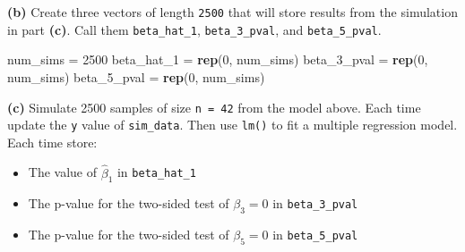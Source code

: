 \documentclass[
]{article}
\newenvironment{Shaded}{\begin{snugshade}}{\end{snugshade}}
\newcommand{\DecValTok}[1]{\textcolor[rgb]{0.00,0.00,0.81}{#1}}
\newcommand{\KeywordTok}[1]{\textcolor[rgb]{0.13,0.29,0.53}{\textbf{#1}}}
\newcommand{\NormalTok}[1]{#1}
\newcommand{\StringTok}[1]{\textcolor[rgb]{0.31,0.60,0.02}{#1}}
\providecommand{\tightlist}{%
  \setlength{\itemsep}{0pt}\setlength{\parskip}{0pt}}
\begin{document}
\textbf{(b)} Create three vectors of length \texttt{2500} that will
store results from the simulation in part \textbf{(c)}. Call them
\texttt{beta\_hat\_1}, \texttt{beta\_3\_pval}, and
\texttt{beta\_5\_pval}.

\begin{Shaded}
\begin{Highlighting}[]
\NormalTok{num_sims =}\StringTok{ }\DecValTok{2500}
\NormalTok{beta_hat_}\DecValTok{1}\NormalTok{ =}\StringTok{ }\KeywordTok{rep}\NormalTok{(}\DecValTok{0}\NormalTok{, num_sims)}
\NormalTok{beta_}\DecValTok{3}\NormalTok{_pval =}\StringTok{ }\KeywordTok{rep}\NormalTok{(}\DecValTok{0}\NormalTok{, num_sims)}
\NormalTok{beta_}\DecValTok{5}\NormalTok{_pval =}\StringTok{ }\KeywordTok{rep}\NormalTok{(}\DecValTok{0}\NormalTok{, num_sims)}
\end{Highlighting}
\end{Shaded}

\textbf{(c)} Simulate 2500 samples of size \texttt{n\ =\ 42} from the
model above. Each time update the \texttt{y} value of
\texttt{sim\_data}. Then use \texttt{lm()} to fit a multiple regression
model. Each time store:

\begin{itemize}
\tightlist
\item
  The value of \(\hat{\beta}_1\) in \texttt{beta\_hat\_1}
\item
  The p-value for the two-sided test of \(\beta_3 = 0\) in
  \texttt{beta\_3\_pval}
\item
  The p-value for the two-sided test of \(\beta_5 = 0\) in
  \texttt{beta\_5\_pval}
\end{itemize}
\end{document}

